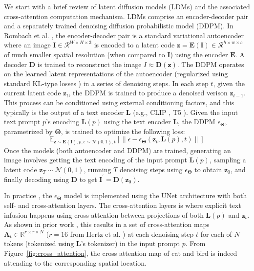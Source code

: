 \documentclass[10pt,twocolumn,letterpaper]{article}
\begin{document}
We start with a brief review of latent diffusion models (LDMs) and the associated cross-attention computation mechanism. LDMs comprise an encoder-decoder pair and a separately trained denoising diffusion probabilistic model (DDPM). In Rombach et al. \cite{rombach2022high}, the encoder-decoder pair is a standard variational autoencoder where an image $\mathbf{I} \in \mathcal{R}^{W\times H \times 3}$ is encoded to a latent code $\mathbf{z} = \mathbf{E}(\mathbf{I}) \in \mathcal{R}^{h\times w \times c}$ of much smaller spatial resolution (when compared to $\mathbf{I}$) using the encoder $\mathbf{E}$. A decoder $\mathbf{D}$ is trained to reconstruct the image $I \approx \mathbf{D}(\mathbf{z})$. The DDPM operates on the learned latent representations of the autoencoder (regularized using standard KL-type losses \cite{kingma2013auto,van2017neural}) in a series of denoising steps. In each step $t$, given the current latent code $\mathbf{z}_{t}$, the DDPM is trained to produce a denoised verison $\mathbf{z}_{t-1}$. This process can be conditioned using external conditioning factors, and this typically is the output of a text encoder $\mathbf{L}$ (e.g., CLIP \cite{radford2021learning}, T5 \cite{raffel2020exploring}). Given the input text prompt $p$'s encoding $\mathbf{L}(p)$ using the text encoder $\mathbf{L}$, the DDPM $\epsilon_{\mathbf{\Theta}}$, parametrized by $\mathbf{\Theta}$, is trained to optimize the following loss:
\begin{equation}
\mathbb{E}_{\mathbf{z}\sim \mathbf{E}(\mathbf{I}),p,\epsilon\sim\mathcal{N}(0,1),t}[\|\epsilon - \epsilon_{\mathbf{\Theta}}(\mathbf{z}_{t}, \mathbf{L}(p), t)\|] 
\end{equation}
Once the models (both autoencoder and DDPM) are trained, generating an image involves getting the text encoding of the input prompt $\mathbf{L}(p)$, sampling a latent code $\mathbf{z}_{T}\sim \mathcal{N}(0,1)$, running $T$ denoising steps using $\epsilon_{\mathbf{\Theta}}$ to obtain $\mathbf{z}_{0}$, and finally decoding using $\mathbf{D}$ to get $\mathbf{I}^{'}=\mathbf{D}(\mathbf{z}_{0})$.

In practice \cite{rombach2022high}, the $\epsilon_{\mathbf{\Theta}}$ model is implemented using the UNet architecture \cite{ronneberger2015u} with both self- and cross-attention layers. The cross-attention layers is where explicit text infusion happens using cross-attention \cite{vaswani2017attention} between projections of both $\mathbf{L}(p)$ and $\mathbf{z}_{t}$. As shown in prior work \cite{chefer2023attend,hertz2022prompt}, this results in a set of cross-attention maps $\mathbf{A}_t \in \mathbb{R}^{r \times r \times N}$ ($r=16$ from Hertz et al. \cite{hertz2022prompt}) at each denoising step $t$ for each of $N$ tokens (tokenized using $\mathbf{L}$'s tokenizer) in the input prompt $p$. From Figure~\ref{fig:cross_attention}, the cross attention map of cat and bird is indeed attending to the corresponding spatial location.
\end{document}
